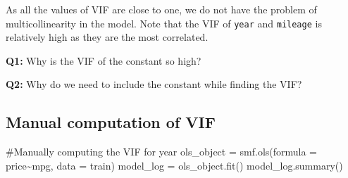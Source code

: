 \documentclass[
  letterpaper,
  DIV=11,
  numbers=noendperiod]{scrreprt}
\newenvironment{Shaded}{\begin{snugshade}}{\end{snugshade}}
\newcommand{\CommentTok}[1]{\textcolor[rgb]{0.37,0.37,0.37}{#1}}
\newcommand{\NormalTok}[1]{\textcolor[rgb]{0.00,0.23,0.31}{#1}}
\newcommand{\OperatorTok}[1]{\textcolor[rgb]{0.37,0.37,0.37}{#1}}
\newcommand{\StringTok}[1]{\textcolor[rgb]{0.13,0.47,0.30}{#1}}
\begin{document}
As all the values of VIF are close to one, we do not have the problem of
multicollinearity in the model. Note that the VIF of \texttt{year} and
\texttt{mileage} is relatively high as they are the most correlated.

\textbf{Q1:} Why is the VIF of the constant so high?

\textbf{Q2:} Why do we need to include the constant while finding the
VIF?

\subsection{Manual computation of VIF}\label{manual-computation-of-vif}

\begin{Shaded}
\begin{Highlighting}[]
\CommentTok{\#Manually computing the VIF for year}
\NormalTok{ols\_object }\OperatorTok{=}\NormalTok{ smf.ols(formula }\OperatorTok{=} \StringTok{\textquotesingle{}price\textasciitilde{}mpg\textquotesingle{}}\NormalTok{, data }\OperatorTok{=}\NormalTok{ train)}
\NormalTok{model\_log }\OperatorTok{=}\NormalTok{ ols\_object.fit()}
\NormalTok{model\_log.summary()}
\end{Highlighting}
\end{Shaded}
\end{document}
